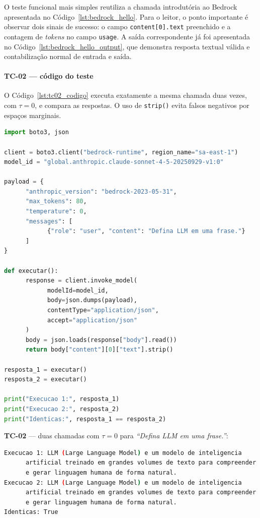 O teste funcional mais simples reutiliza a chamada introdut\'oria ao
Bedrock apresentada no C\'odigo~\ref{lst:bedrock_hello}. Para o leitor,
o ponto importante \'e observar dois sinais de sucesso: o campo
\texttt{content[0].text} preenchido e a contagem de \textit{tokens} no
campo \texttt{usage}. A sa\'ida correspondente j\'a foi apresentada no
C\'odigo~\ref{lst:bedrock_hello_output}, que demonstra resposta textual
v\'alida e contabiliza\c{c}\~ao normal de entrada e sa\'ida.

\paragraph{TC-02 --- c\'odigo do teste}

O C\'odigo~\ref{lst:tc02_codigo} executa exatamente a mesma chamada duas
vezes, com $\tau = 0$, e compara as respostas. O uso de
\texttt{strip()} evita falsos negativos por espa\c{c}os marginais.

\begin{lstlisting}[language=Python,
        caption={TC-02 --- c\'odigo m\'inimo para verificar determinismo.},
        label={lst:tc02_codigo}]
import boto3, json

client = boto3.client("bedrock-runtime", region_name="sa-east-1")
model_id = "global.anthropic.claude-sonnet-4-5-20250929-v1:0"

payload = {
      "anthropic_version": "bedrock-2023-05-31",
      "max_tokens": 80,
      "temperature": 0,
      "messages": [
            {"role": "user", "content": "Defina LLM em uma frase."}
      ]
}

def executar():
      response = client.invoke_model(
            modelId=model_id,
            body=json.dumps(payload),
            contentType="application/json",
            accept="application/json"
      )
      body = json.loads(response["body"].read())
      return body["content"][0]["text"].strip()

resposta_1 = executar()
resposta_2 = executar()

print("Execucao 1:", resposta_1)
print("Execucao 2:", resposta_2)
print("Identicas:", resposta_1 == resposta_2)
\end{lstlisting}

\textbf{TC-02} --- duas chamadas com $\tau = 0$ para
\textit{``Defina LLM em uma frase.''}:

\begin{lstlisting}[language=bash,
      caption={TC-02 --- determinismo verificado com temperatura $= 0$.},
      label={lst:tc02_determinismo}]
Execucao 1: LLM (Large Language Model) e um modelo de inteligencia
      artificial treinado em grandes volumes de texto para compreender
      e gerar linguagem humana de forma natural.
Execucao 2: LLM (Large Language Model) e um modelo de inteligencia
      artificial treinado em grandes volumes de texto para compreender
      e gerar linguagem humana de forma natural.
Identicas: True
\end{lstlisting}


